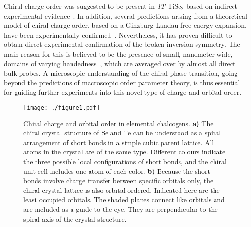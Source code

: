 \documentclass[aps,prl,twocolumn,superscriptaddress,groupedaddress]{revtex4}
\begin{document}
Chiral charge order was suggested to be present in \emph{1T}-TiSe$_2$ based on indirect experimental evidence~\cite{ishioka}. In addition, several predictions arising from a theoretical model of chiral charge order, based on a Ginzburg-Landau free energy expansion, have been experimentally confirmed~\cite{vanwezel,castellan,iavarone}. Nevertheless, it has proven difficult to obtain direct experimental confirmation of the broken inversion symmetry. The main reason for this is believed to be the presence of small, nanometer wide, domains of varying handedness~\cite{iavarone}, which are averaged over by almost all direct bulk probes. A microscopic understanding of the chiral phase transition, going beyond the predictions of macroscopic order parameter theory, is thus essential for guiding further experiments into this novel type of charge and orbital order.
%
\begin{figure}
\begin{centering}
\texttt{[image: ./figure1.pdf]}
\end{centering}
\caption{\label{fig:Xtal}Chiral charge and orbital order in elemental chalcogens. {\bf a)} The chiral crystal structure of Se and Te can be understood as a spiral arrangement of short bonds in a simple cubic parent lattice. All atoms in the crystal are of the same type. Different colours indicate the three possible local configurations of short bonds, and the chiral unit cell includes one atom of each color. {\bf b)} Because the short bonds involve charge transfer between specific orbitals only, the chiral crystal lattice is also orbital ordered. Indicated here are the least occupied orbitals. The shaded planes connect like orbitals and are included as a guide to the eye. They are perpendicular to the spiral axis of the crystal structure.}
\end{figure}
\end{document}
